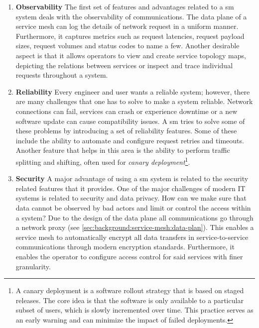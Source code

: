 \begin{enumerate}[leftmargin=3\parindent]
    \item \textbf{Observability}
    The first set of features and advantages related to a \gls{sm} system deals with the observability of communications. The data plane of a service mesh can log the details of network request in a uniform manner. Furthermore, it captures metrics such as request latencies, request payload sizes, request volumes and status codes to name a few. Another desirable aspect is that it allows operators to view and create service topology maps, depicting the relations between services or inspect and trace individual requests throughout a system.
    
    \item \textbf{Reliability}
    Every engineer and user wants a reliable system; however, there are many challenges that one has to solve to make a system reliable. Network connections can fail, services can crash or experience downtime or a new software update can cause compatibility issues. A \gls{sm} tries to solve some of these problems by introducing a set of reliability features. Some of these include the ability to automate and configure request retries and timeouts. Another feature that helps in this area is the ability to perform traffic splitting and shifting, often used for \textit{canary deployment}\footnote{A  canary deployment is a software rollout strategy that is based on staged releases. The core idea is that the software is only available to a particular subset of users, which is slowly incremented over time. This practice serves as an early warning and can minimize the impact of failed deployments.}.

    \item \textbf{Security}
    A major advantage of using a \gls{sm} system is related to the security related features that it provides. One of the major challenges of modern IT systems is related to security and data privacy. How can we make sure that data cannot be observed by bad actors and limit or control the access within a system? Due to the design of the data plane all communications go through a network proxy (see \cref{sec:background:service-mesh:data-plan}). This enables a service mesh to automatically encrypt all data transfers in service-to-service communications through modern encryption standards. Furthermore, it enables the operator to configure access control for said services with finer granularity.
    

\end{enumerate}
